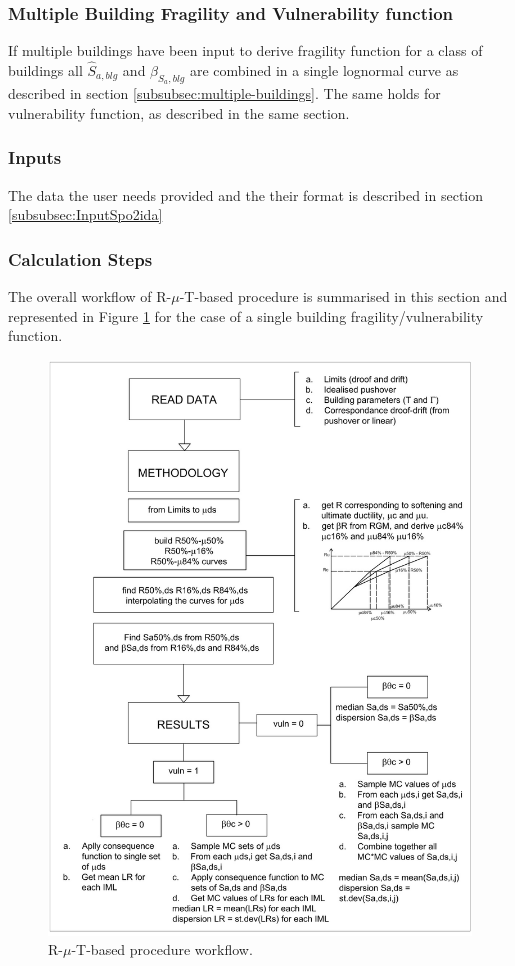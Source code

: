 \subsubsection{Multiple Building Fragility and Vulnerability function}
\label{subsubsec:multiple-building-DF}
 If multiple buildings have been input to derive fragility function for a class of buildings all $\hat{S}_{a, blg}$ and $\beta_{S_a, blg}$ are combined in a single lognormal curve as described in section \ref{subsubsec:multiple-buildings}. The same holds for vulnerability function, as described in the same section.

\subsubsection{Inputs}
The data the user needs provided and the their format is described in section \ref{subsubsec:InputSpo2ida}

\subsubsection{Calculation Steps} 
The overall workflow of R-$\mu$-T-based procedure is summarised in this section and represented in Figure \ref{fig:Cr_workflow} for the case of a single building fragility/vulnerability function. 

\begin{figure}[!htbp]
\centering
\includegraphics[width=15cm]{./figures/DF_WorkFlow.jpg}
\caption{R-$\mu$-T-based procedure workflow.}
\label{fig:Cr_workflow}
\end{figure}

